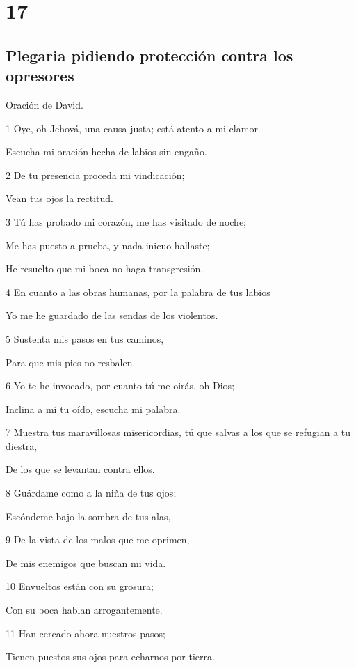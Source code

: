 \chapter{17}

\section*{Plegaria pidiendo protección contra los opresores}

\par Oración de David.

\par 1 Oye, oh Jehová, una causa justa; está atento a mi clamor.
\par Escucha mi oración hecha de labios sin engaño.
\par 2 De tu presencia proceda mi vindicación;
\par Vean tus ojos la rectitud.
\par 3 Tú has probado mi corazón, me has visitado de noche;
\par Me has puesto a prueba, y nada inicuo hallaste;
\par He resuelto que mi boca no haga transgresión.
\par 4 En cuanto a las obras humanas, por la palabra de tus labios
\par Yo me he guardado de las sendas de los violentos.
\par 5 Sustenta mis pasos en tus caminos,
\par Para que mis pies no resbalen.
\par 6 Yo te he invocado, por cuanto tú me oirás, oh Dios;
\par Inclina a mí tu oído, escucha mi palabra.
\par 7 Muestra tus maravillosas misericordias, tú que salvas a los que se refugian a tu diestra,
\par De los que se levantan contra ellos.
\par 8 Guárdame como a la niña de tus ojos;
\par Escóndeme bajo la sombra de tus alas,
\par 9 De la vista de los malos que me oprimen,
\par De mis enemigos que buscan mi vida.
\par 10 Envueltos están con su grosura;
\par Con su boca hablan arrogantemente.
\par 11 Han cercado ahora nuestros pasos;
\par Tienen puestos sus ojos para echarnos por tierra.
